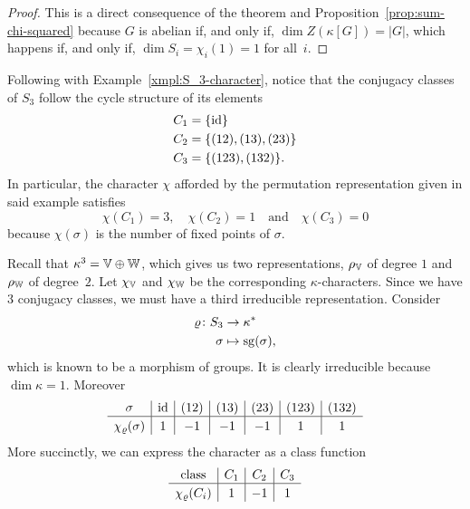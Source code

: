 \begin{proof}
    This is a direct consequence of the theorem and Proposition~\ref{prop:sum-chi-squared} because $G$ is abelian if, and only if, $\dim Z(\kappa[G])=|G|$, which happens if, and only if, $\dim S_i=\chi_i(1)=1$ for all~$i$.
\end{proof}

\begin{xmpl}\label{xmpl:S3-character-table}
    Following with Example~\ref{xmpl:S_3-character}, notice that the conjugacy classes of $S_3$ follow the cycle structure of its elements
    \begin{align*}
        C_1 &= \{\operatorname{id}\}\\
        C_2 &= \{(12),(13),(23)\}\\
        C_3 &= \{(123),(132)\}.
    \end{align*}
    In particular, the character $\chi$ afforded by the permutation representation given in said example satisfies
    $$
        \chi(C_1) = 3,\quad \chi(C_2)= 1\quad
        \text{and}\quad \chi(C_3)=0
    $$
    because $\chi(\sigma)$ is the number of fixed points of $\sigma$.
    
    Recall that $\kappa^3=\mathbb V\oplus\mathbb W$, which gives us two representations, $\rho_\mathbb V$ of degree $1$ and $\rho_\mathbb W$ of degree~$2$. Let $\chi_\mathbb V$ and $\chi_\mathbb W$ be the corresponding $\kappa$-characters. Since we have $3$ conjugacy classes, we must have a third irreducible representation. Consider
    \begin{align*}
        \varrho\colon S_3&\to\kappa^*\\
        \sigma&\mapsto\operatorname{sg}(\sigma),
    \end{align*}
    which is known to be a morphism of groups. It is clearly irreducible because $\dim\kappa=1$. Moreover
    $$
    \begin{array}{c|c|c|c|c|c|c}
        \sigma&\id&(12)&(13)&(23)&(123)&(132)\\\hline
        \vphantom{|^{|^|}}
        \chi_\varrho(\sigma)&1&-1&-1&-1&1&1
    \end{array}
    $$
    More succinctly, we can express the character as a class function
    $$
    \begin{array}{c|c|c|c}
        \text{class}&C_1&C_2&C_3\\\hline
        \vphantom{|^{|^|}}
        \chi_\varrho(C_i)&1&-1&1
    \end{array}
    $$
    

\end{xmpl}
